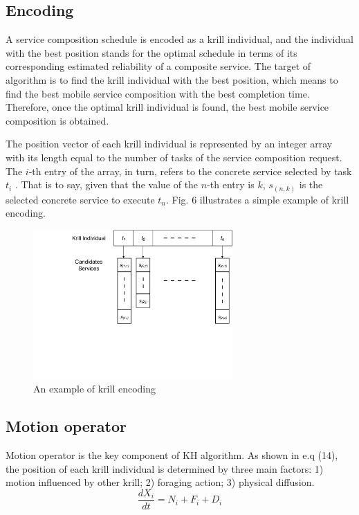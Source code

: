 \documentclass[journal]{IEEEtran}
\begin{document}
\subsection{Encoding}
A service composition schedule is encoded as a krill individual, and the individual with the best position stands for the optimal schedule in terms of its corresponding estimated reliability of a composite service. The target of algorithm is to find the krill individual with the best position, which means to find the best mobile service composition with the best completion time. Therefore, once the optimal krill individual is found, the best mobile service composition is obtained.

The position vector of each krill individual is represented by an integer array with its length equal to the number of tasks of the service composition request. The $i$-th entry of the array, in turn, refers to the concrete service selected by task $t_i$ . That is to say, given that the value of the $n$-th entry is $k$, $s_{(n,k)}$ is the selected concrete service to execute $t_n$. Fig. 6 illustrates a simple example of  krill encoding.

\begin{figure}[!t]
\centering
\includegraphics[width=3in]{./img/pic4.pdf}
\caption{An example of krill encoding}
\label{Krill encoding}
\end{figure}


\subsection{Motion operator}
% 
% 

Motion operator is the key component of KH algorithm. As shown in e.q (14), the position of each krill individual is determined by three main factors: 1) motion influenced by other krill; 2) foraging action; 3) physical diffusion. 
\begin{equation}
\frac{dX_i}{dt} =N_i+F_i+D_i
\end{equation}
\end{document}
